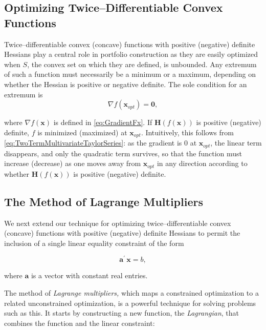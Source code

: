\documentclass[graybox,envcountchap,sectrefs]{svmono}\usepackage[]{graphicx}\usepackage[]{xcolor}
\begin{document}
\begin{appendices}
\subsection{Optimizing Twice--Differentiable Convex Functions}

Twice--differentiable convex (concave) functions with positive (negative)
definite Hessians play a central role in portfolio construction as
they are easily optimized when $S$, the convex set on which they
are defined, is unbounded. Any extremum of such a function must necessarily
be a minimum or a maximum, depending on whether the Hessian is positive
or negative definite. The sole condition for an extremum is
\begin{equation}
\nabla f\left(\mathrm{\mathbf{x}}_{opt}\right)=\mathbf{0},\label{eq:GradientFxEq0}
\end{equation}

where $\nabla f\left(\mathrm{\mathbf{x}}\right)$ is defined in \eqref{eq:GradientFx}.
If $\mathrm{\mathbf{H}}\left(f\left(\mathrm{\mathbf{x}}\right)\right)$
is positive (negative) definite, $f$ is minimized (maximized) at
$\mathrm{\mathbf{x}}_{opt}$. Intuitively, this follows from \eqref{eq:TwoTermMultivariateTaylorSeries}:
as the gradient is 0 at $\mathrm{\mathbf{x}}_{opt}$, the linear term
disappears, and only the quadratic term survives, so that the function
must increase (decrease) as one moves away from $\mathrm{\mathbf{x}}_{opt}$
in any direction according to whether $\mathrm{\mathbf{H}}\left(f\left(\mathrm{\mathbf{x}}\right)\right)$
is positive (negative) definite.

\subsection{The Method of Lagrange Multipliers}

We next extend our technique for optimizing twice--differentiable
convex (concave) functions with positive (negative) definite Hessians
to permit the inclusion of a single linear equality constraint of
the form

\begin{equation}
\mathrm{\mathbf{a^{\prime}\,x}}=b\mathrm{,}\label{eq:EqualityConstraints}
\end{equation}

where $\mathrm{\mathbf{a}}$ is a vector with constant real entries.

The method of \emph{Lagrange multipliers,} which maps a constrained
optimization to a related unconstrained optimization, is a powerful
technique for solving problems such as this. It starts by constructing
a new function, the \emph{Lagrangian}, that combines the function
and the linear constraint:


\end{appendices}
\end{document}
